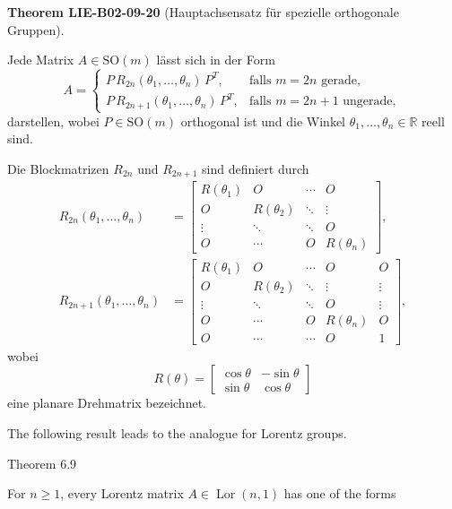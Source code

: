 \documentclass[10pt, letterpaper]{article}
\newcommand{\CustomHeading}[3]{%
  \par\medskip\noindent%
  \textbf{#1 #2} \textnormal{(#3)}.\enskip%
}
\newenvironment{THEO}[2]{\begin{unitbox}\CustomHeading{Theorem}{#1}{#2}}{\end{unitbox}}
\begin{document}
\begin{THEO}{LIE-B02-09-20}{Hauptachsensatz für spezielle orthogonale Gruppen}
Jede Matrix \(A \in \mathrm{SO}(m)\) lässt sich in der Form
\[
A =
\begin{cases}
P\, R_{2n}(\theta_{1},\ldots,\theta_{n})\, P^{T}, & \text{falls } m = 2n \text{ gerade},\\[6pt]
P\, R_{2n+1}(\theta_{1},\ldots,\theta_{n})\, P^{T}, & \text{falls } m = 2n+1 \text{ ungerade},
\end{cases}
\]
darstellen, wobei \(P \in \mathrm{SO}(m)\) orthogonal ist und die Winkel \(\theta_{1},\ldots,\theta_{n} \in \mathbb{R}\) reell sind.

Die Blockmatrizen \(R_{2n}\) und \(R_{2n+1}\) sind definiert durch
\[
\begin{aligned}
R_{2n}(\theta_{1},\ldots,\theta_{n})
&=
\begin{bmatrix}
R(\theta_{1}) & O & \cdots & O\\[2pt]
O & R(\theta_{2}) & \ddots & \vdots\\[2pt]
\vdots & \ddots & \ddots & O\\[2pt]
O & \cdots & O & R(\theta_{n})
\end{bmatrix},
\\[6pt]
R_{2n+1}(\theta_{1},\ldots,\theta_{n})
&=
\begin{bmatrix}
R(\theta_{1}) & O & \cdots & O & O\\[2pt]
O & R(\theta_{2}) & \ddots & \vdots & \vdots\\[2pt]
\vdots & \ddots & \ddots & O & \vdots\\[2pt]
O & \cdots & O & R(\theta_{n}) & O\\[2pt]
O & \cdots & \cdots & O & 1
\end{bmatrix},
\end{aligned}
\]
wobei
\[
R(\theta) =
\begin{bmatrix}
\cos\theta & -\sin\theta\\[2pt]
\sin\theta & \cos\theta
\end{bmatrix}
\]
eine planare Drehmatrix bezeichnet.
\end{THEO}





The following result leads to the analogue for Lorentz groups.


Theorem 6.9

For $n \geqslant 1$, every Lorentz matrix $A \in \operatorname{Lor}(n, 1)$ has one of the forms
\end{document}
